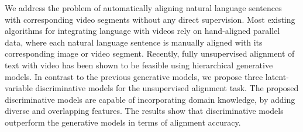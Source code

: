 We address the problem of automatically aligning natural language sentences with corresponding video segments without any direct supervision. Most existing algorithms for integrating language with videos rely on hand-aligned parallel data, where each natural language sentence is manually aligned with its corresponding image or video segment. Recently, fully unsupervised alignment of text with video has been shown to be feasible using hierarchical generative models. In contrast to the previous generative models, we propose three latent-variable discriminative models for the unsupervised alignment task. The proposed discriminative models are capable of incorporating domain knowledge, by adding diverse and overlapping features. The results show that discriminative models outperform the generative models in terms of alignment accuracy.
